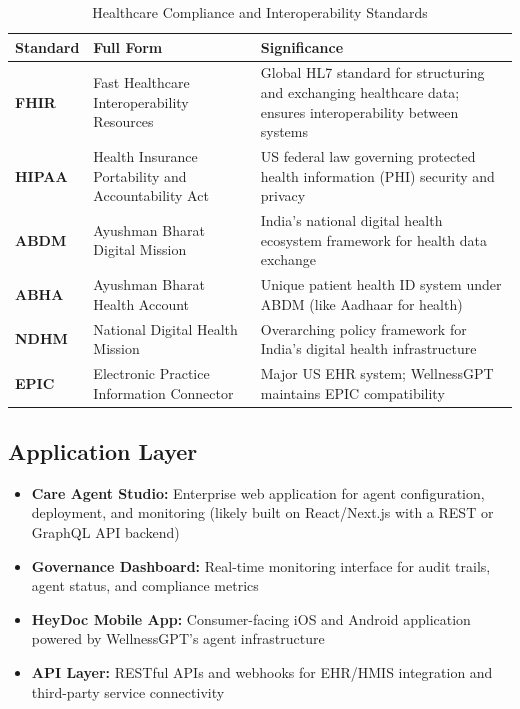 \documentclass[12pt,a4paper]{article}
\begin{document}
\begin{table}[H]
\centering
\renewcommand{\arraystretch}{1.4}
\begin{tabularx}{\textwidth}{llX}
\toprule
\textbf{Standard} & \textbf{Full Form} & \textbf{Significance} \\
\midrule
\textbf{FHIR} & Fast Healthcare Interoperability Resources & Global HL7 standard for structuring and exchanging healthcare data; ensures interoperability between systems \\
\textbf{HIPAA} & Health Insurance Portability and Accountability Act & US federal law governing protected health information (PHI) security and privacy \\
\textbf{ABDM} & Ayushman Bharat Digital Mission & India's national digital health ecosystem framework for health data exchange \\
\textbf{ABHA} & Ayushman Bharat Health Account & Unique patient health ID system under ABDM (like Aadhaar for health) \\
\textbf{NDHM} & National Digital Health Mission & Overarching policy framework for India's digital health infrastructure \\
\textbf{EPIC} & Electronic Practice Information Connector & Major US EHR system; WellnessGPT maintains EPIC compatibility \\
\bottomrule
\end{tabularx}
\caption{Healthcare Compliance and Interoperability Standards}
\end{table}

\subsection{Application Layer}

\begin{itemize}[noitemsep]
    \item \textbf{Care Agent Studio:} Enterprise web application for agent configuration, deployment, and monitoring (likely built on React/Next.js with a REST or GraphQL API backend)
    \item \textbf{Governance Dashboard:} Real-time monitoring interface for audit trails, agent status, and compliance metrics
    \item \textbf{HeyDoc Mobile App:} Consumer-facing iOS and Android application powered by WellnessGPT's agent infrastructure
    \item \textbf{API Layer:} RESTful APIs and webhooks for EHR/HMIS integration and third-party service connectivity
\end{itemize}
\end{document}
